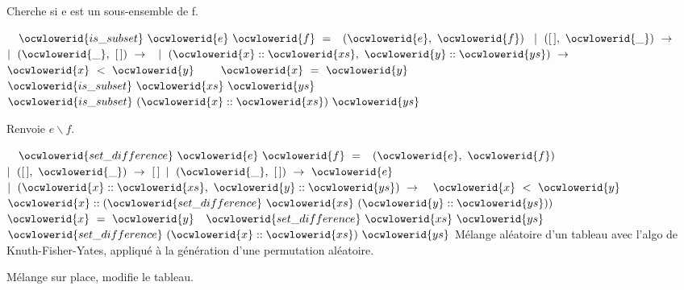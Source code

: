 \documentclass[12pt]{article}
\begin{document}
\ocweol
\ocwindent{0.00em}
Cherche si e est un sous-ensemble de f.

\ocweol
\label{Permutation.ml:5130}%
\medskip
\ocwbegincode{}\ocwindent{0.00em}
~~$\ocwlowerid{is\_subset}~\ocwlowerid{e}~\ocwlowerid{f}~=~$~$(\ocwlowerid{e},~\ocwlowerid{f})~$\ocweol
\ocwindent{2.00em}
$\mid{}~([\,],~\ocwlowerid{\_})~\rightarrow{}~$\ocweol
\ocwindent{2.00em}
$\mid{}~(\ocwlowerid{\_},~[\,])~\rightarrow{}~$\ocweol
\ocwindent{2.00em}
$\mid{}~(\ocwlowerid{x}::\ocwlowerid{xs},~\ocwlowerid{y}::\ocwlowerid{ys})~\rightarrow{}~$~$\ocwlowerid{x}~<~\ocwlowerid{y}~$~\ocweol
\ocwindent{12.00em}
~~$\ocwlowerid{x}~=~\ocwlowerid{y}~$~$\ocwlowerid{is\_subset}~\ocwlowerid{xs}~\ocwlowerid{ys}$\ocweol
\ocwindent{14.50em}
~$\ocwlowerid{is\_subset}~(\ocwlowerid{x}::\ocwlowerid{xs})~\ocwlowerid{ys}$\medskip

\ocwendcode{}\ocwindent{0.00em}
Renvoie $e \backslash f$.

\ocweol
\label{Permutation.ml:5411}%
\medskip
\ocwbegincode{}\ocwindent{0.00em}
~~$\ocwlowerid{set\_difference}~\ocwlowerid{e}~\ocwlowerid{f}~=~$~$(\ocwlowerid{e},~\ocwlowerid{f})~$\ocweol
\ocwindent{2.00em}
$\mid{}~([\,],~\ocwlowerid{\_})~\rightarrow{}~[\,]$\ocweol
\ocwindent{2.00em}
$\mid{}~(\ocwlowerid{\_},~[\,])~\rightarrow{}~\ocwlowerid{e}$\ocweol
\ocwindent{2.00em}
$\mid{}~(\ocwlowerid{x}::\ocwlowerid{xs},~\ocwlowerid{y}::\ocwlowerid{ys})~\rightarrow{}~$~$\ocwlowerid{x}~<~\ocwlowerid{y}~$~$\ocwlowerid{x}::(\ocwlowerid{set\_difference}~\ocwlowerid{xs}~(\ocwlowerid{y}::\ocwlowerid{ys}))$\ocweol
\ocwindent{12.00em}
~~$\ocwlowerid{x}~=~\ocwlowerid{y}~$~$\ocwlowerid{set\_difference}~\ocwlowerid{xs}~\ocwlowerid{ys}$\ocweol
\ocwindent{14.50em}
~$\ocwlowerid{set\_difference}~(\ocwlowerid{x}::\ocwlowerid{xs})~\ocwlowerid{ys}$\ocweol
\ocwendcode{}\allowbreak\ocwsection
\label{Permutation.ml:5697}%
Mélange aléatoire d'un tableau avec l'algo de Knuth-Fisher-Yates,
   appliqué à la génération d'une permutation aléatoire.

\ocweol
\ocwindent{0.00em}
Mélange sur place, modifie le tableau.
\end{document}
